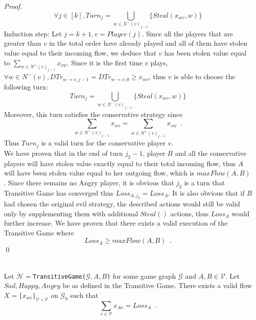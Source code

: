\documentclass[11pt]{llncs}
\begin{document}
\begin{proof}
       \begin{equation}
          \forall j \in [k], Turn_j = \bigcup\limits_{w \in N^{-}\left(v\right)_{j-1}}\{Steal\left(x_{wv}, w\right)\}
       \end{equation}
       Induction step: Let $j = k + 1, v = Player\left(j\right)$. Since all the players that are greater than $v$ in the
       total order have already played and all of them have stolen value equal to their incoming flow, we deduce that $v$ has
       been stolen value equal to $\sum\limits_{w \in N^{+}\left(v\right)_{j-1}}x_{vw}$. Since it is the first time $v$
       plays, $\forall w \in N^{-}\left(v\right), DTr_{w \rightarrow v, j-1} = DTr_{w \rightarrow v, 0} \geq x_{wv}$, thus
       $v$ is able to choose the following turn:
       \begin{equation}
          Turn_j = \bigcup\limits_{w \in N^{-}\left(v\right)_{j-1}}\{Steal\left(x_{wv}, w\right)\}
       \end{equation}
       Moreover, this turn satisfies the conservative strategy since
       \begin{equation}
          \sum\limits_{w \in N^{-}\left(v\right)_{j-1}}x_{wv} = \sum\limits_{w \in N^{+}\left(v\right)_{j-1}}x_{vw} \enspace.
       \end{equation}
       Thus $Turn_j$ is a valid turn for the conservative player $v$. \\
       We have proven that in the end of turn $j_2 - 1$, player $B$ and all the conservative players will have stolen value
       exactly equal to their total incoming flow, thus $A$ will have been stolen value equal to her outgoing flow, which is
       $maxFlow(A, B)$. Since there remains no Angry player, it is obvious that $j_2$ is a turn that Transitive Game has
       converged thus $Loss_{A, j_2} = Loss_A$. It is also obvious that if $B$ had chosen the original evil strategy, the
       described actions would still be valid only by supplementing them with additional $Steal\left(\right)$ actions, thus
       $Loss_A$ would further increase.  We have proven that there exists a valid execution of the Transitive Game where
       \begin{equation}
          Loss_A \geq maxFlow\left(A, B\right) \enspace.
       \end{equation}
       \qed
    \end{proof}
    \begin{lemma} \ \\
       \label{gameflow}
       Let $\mathcal{H} = $\texttt{TransitiveGame(}$\mathcal{G}, A, B$\texttt{)} for some game graph $\mathcal{G}$ and $A,
       B \in \mathcal{V}$. Let $Sad, Happy, Angry$ be as defined in the Transitive Game. There exists a valid flow
       $X = \{x_{wv}\}_{\mathcal{V} \times \mathcal{V}}$ on $\mathcal{G}_0$ such that
       \begin{equation}
          \sum\limits_{v \in \mathcal{V}}x_{Av} = Loss_A \enspace.
       \end{equation}
    \end{lemma}
\end{document}
